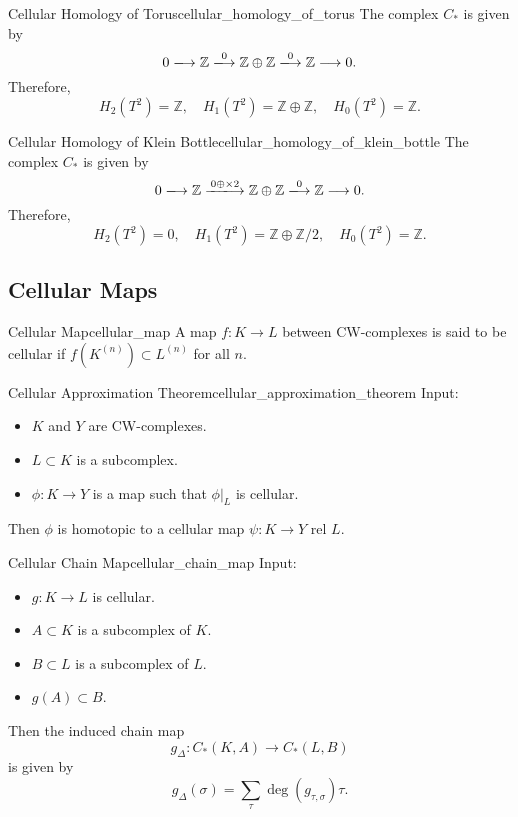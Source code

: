 \documentclass{article}
\begin{document}
\begin{example}{Cellular Homology of Torus}{cellular_homology_of_torus}
    The complex $C_*$ is given by
    \[ 0 \xlongrightarrow{} \mathbb{Z} \xlongrightarrow{0} \mathbb{Z} \oplus \mathbb{Z} \xlongrightarrow{0} \mathbb{Z} \longrightarrow 0. \]
    Therefore,
    \[ H_2(T^2) = \mathbb{Z},\quad H_1(T^2) = \mathbb{Z} \oplus \mathbb{Z},\quad H_0(T^2) = \mathbb{Z}. \]
\end{example}

\begin{example}{Cellular Homology of Klein Bottle}{cellular_homology_of_klein_bottle}
    The complex $C_*$ is given by
    \[ 0 \xlongrightarrow{} \mathbb{Z} \xlongrightarrow{0 \oplus \times 2} \mathbb{Z} \oplus \mathbb{Z} \xlongrightarrow{0} \mathbb{Z} \longrightarrow 0. \]
    Therefore,
    \[ H_2(T^2) = 0,\quad H_1(T^2) = \mathbb{Z} \oplus \mathbb{Z}/2,\quad H_0(T^2) = \mathbb{Z}. \]
\end{example}

\subsection{Cellular Maps}

\begin{definition}{Cellular Map}{cellular_map}
    A map $f:K\rightarrow L$ between CW-complexes is said to be cellular if $f(K^{(n)}) \subset L^{(n)}$ for all $n$.
\end{definition}

\begin{theorem}{Cellular Approximation Theorem}{cellular_approximation_theorem}
    Input:
    \begin{itemize}
        \item $K$ and $Y$ are CW-complexes.
        \item $L\subset K$ is a subcomplex.
        \item $\phi:K\rightarrow Y$ is a map such that $\phi\vert_L$ is cellular.
    \end{itemize}
    Then $\phi$ is homotopic to a cellular map $\psi: K\rightarrow Y$ rel $L$.
\end{theorem}

\begin{theorem}{Cellular Chain Map}{cellular_chain_map}
    Input:
    \begin{itemize}
        \item $g:K\rightarrow L$ is cellular.
        \item $A\subset K$ is a subcomplex of $K$.
        \item $B\subset L$ is a subcomplex of $L$.
        \item $g(A)\subset B$.
    \end{itemize}
    Then the induced chain map
    \[ g_{\Delta}: C_*(K,A) \rightarrow C_*(L,B) \]
    is given by
    \[ g_\Delta(\sigma) = \sum_\tau \operatorname{deg}(g_{\tau,\sigma})\tau. \]
\end{theorem}
\end{document}
